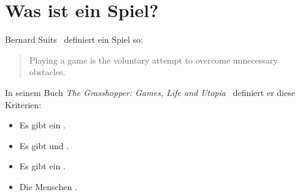 \section{Was ist ein Spiel?}
\label{spiel-definition}

Bernard Suits~\cite{game-suits} definiert ein Spiel so:

\begin{quote}
    Playing a game is the voluntary attempt to overcome unnecessary obstacles.
\end{quote}

In seinem Buch \emph{The Grasshopper: Games, Life and Utopia}~\cite{suits-grashopper} definiert er diese Kriterien:

\begin{itemize}
    \item Es gibt ein .
    \item Es gibt  und .
    \item Es gibt ein .
    \item Die Menschen .
\end{itemize}
